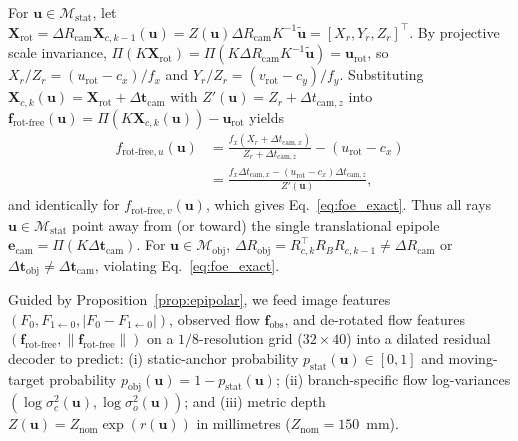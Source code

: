 \documentclass[journal]{IEEEtran}
\begin{document}
\begin{IEEEproof}
For $\mathbf{u} \in \mathcal{M}_{\text{stat}}$, let $\mathbf{X}_{\text{rot}} = \Delta R_{\text{cam}}\mathbf{X}_{c,k-1}(\mathbf{u}) = Z(\mathbf{u})\Delta R_{\text{cam}}K^{-1}\tilde{\mathbf{u}} = [X_r, Y_r, Z_r]^\top$. By projective scale invariance, $\Pi(K\mathbf{X}_{\text{rot}}) = \Pi(K\Delta R_{\text{cam}}K^{-1}\tilde{\mathbf{u}}) = \mathbf{u}_{\text{rot}}$, so $X_r/Z_r = (u_{\text{rot}}-c_x)/f_x$ and $Y_r/Z_r = (v_{\text{rot}}-c_y)/f_y$. Substituting $\mathbf{X}_{c,k}(\mathbf{u}) = \mathbf{X}_{\text{rot}} + \Delta\mathbf{t}_{\text{cam}}$ with $Z'(\mathbf{u}) = Z_r + \Delta t_{\text{cam},z}$ into $\mathbf{f}_{\text{rot-free}}(\mathbf{u}) = \Pi(K\mathbf{X}_{c,k}(\mathbf{u})) - \mathbf{u}_{\text{rot}}$ yields
\begin{align}
f_{\text{rot-free},u}(\mathbf{u}) &= \frac{f_x(X_r + \Delta t_{\text{cam},x})}{Z_r + \Delta t_{\text{cam},z}} - (u_{\text{rot}} - c_x) \nonumber\\
&= \frac{f_x \Delta t_{\text{cam},x} - (u_{\text{rot}} - c_x)\Delta t_{\text{cam},z}}{Z'(\mathbf{u})},
\end{align}
and identically for $f_{\text{rot-free},v}(\mathbf{u})$, which gives Eq.~\eqref{eq:foe_exact}. Thus all rays $\mathbf{u} \in \mathcal{M}_{\text{stat}}$ point away from (or toward) the single translational epipole $\mathbf{e}_{\text{cam}} = \Pi(K\Delta\mathbf{t}_{\text{cam}})$. For $\mathbf{u} \in \mathcal{M}_{\text{obj}}$, $\Delta R_{\text{obj}} = R_{c,k}^\top R_B R_{c,k-1} \neq \Delta R_{\text{cam}}$ or $\Delta\mathbf{t}_{\text{obj}} \neq \Delta\mathbf{t}_{\text{cam}}$, violating Eq.~\eqref{eq:foe_exact}.
\end{IEEEproof}

Guided by Proposition~\ref{prop:epipolar}, we feed image features $(F_0, F_{1\leftarrow 0}, |F_0 - F_{1\leftarrow 0}|)$, observed flow $\mathbf{f}_{\text{obs}}$, and de-rotated flow features $(\mathbf{f}_{\text{rot-free}}, \|\mathbf{f}_{\text{rot-free}}\|)$ on a $1/8$-resolution grid ($32\times 40$) into a dilated residual decoder to predict: (i) static-anchor probability $p_{\text{stat}}(\mathbf{u}) \in [0,1]$ and moving-target probability $p_{\text{obj}}(\mathbf{u}) = 1 - p_{\text{stat}}(\mathbf{u})$; (ii) branch-specific flow log-variances $(\log\sigma_c^2(\mathbf{u}), \log\sigma_o^2(\mathbf{u}))$; and (iii) metric depth $Z(\mathbf{u}) = Z_{\text{nom}}\exp(r(\mathbf{u}))$ in millimetres ($Z_{\text{nom}} = 150$~mm).
\end{document}
